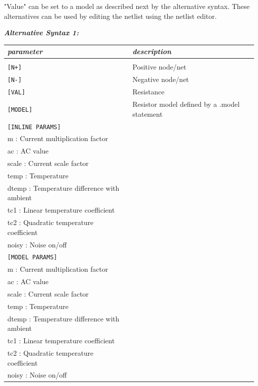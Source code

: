 "\textsf{Value}" can be set to a model as described next by the alternative syntax. These alternatives can be used by editing the netlist using the netlist editor.
\newline\noindent
{\color{darkgray}
\textbf{\textit{Alternative Syntax 1:}}


\begin{longtable}{l l}
\textit{parameter} & \textit{description} \\ \hline \\ \vspace{-0.8\parskip}
\texttt{[N+]} & Positive node/net \\
\texttt{[N-]} & Negative node/net \\
\texttt{[VAL]} & Resistance \\
\texttt{[MODEL]} & Resistor model defined by a .model statement \\
\texttt{[INLINE PARAMS]} & \begin{tabular}{lp{5.5cm}p{5cm}}\textit{Inline parameters :} \\ 
																					{\small m : Current multiplication factor} \\ 
																					{\small ac : AC value} \\
																					{\small scale : Current scale factor} \\
																					{\small temp :  Temperature} \\
																					{\small dtemp : Temperature difference with ambient} \\
																					{\small tc1 : Linear temperature coefficient} \\
																					{\small tc2 : Quadratic temperature coefficient} \\
																					{\small noisy : Noise on/off}\end{tabular} \\
\texttt{[MODEL PARAMS]} & \begin{tabular}{lp{5.5cm}p{5cm}}\textit{Model parameters :} \\ 
																					{\small m : Current multiplication factor} \\ 
																					{\small ac : AC value} \\
																					{\small scale : Current scale factor} \\
																					{\small temp :  Temperature} \\
																					{\small dtemp : Temperature difference with ambient} \\
																					{\small tc1 : Linear temperature coefficient} \\
																					{\small tc2 : Quadratic temperature coefficient} \\
																					{\small noisy : Noise on/off}\end{tabular}																					
\end{longtable}

}
